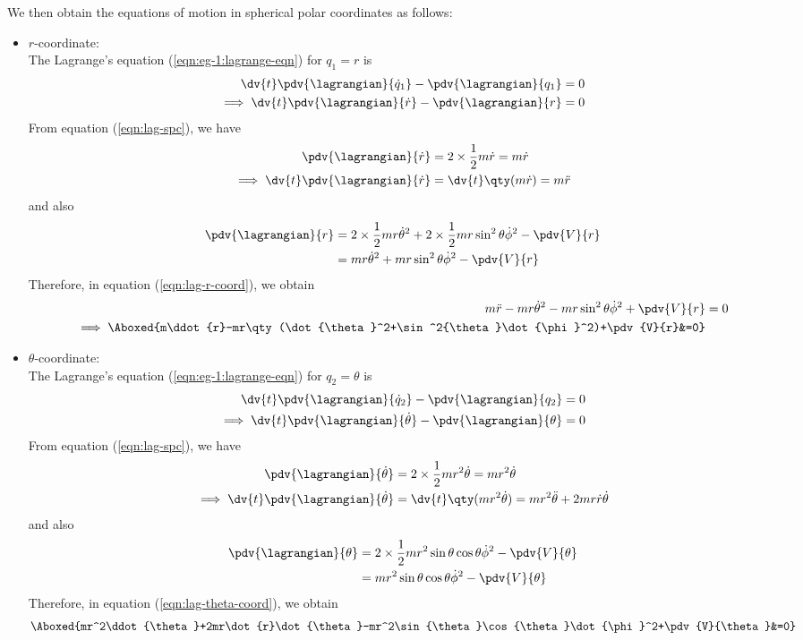 \begin{enumerate}
	We then obtain the equations of motion in spherical polar coordinates as follows:
	\begin{itemize}
		\item $r$-coordinate:\\
		The Lagrange's equation (\ref{eqn:eg-1:lagrange-eqn}) for $q_1=r$ is
		\begin{align}
			\dv{t}\pdv{\lagrangian}{\dot{q}_1}-\pdv{\lagrangian}{q_1}&=0 \nonumber\\
			\implies\dv{t}\pdv{\lagrangian}{\dot{r}}-\pdv{\lagrangian}{r}&=0 \label{eqn:lag-r-coord}
		\end{align}
		From equation (\ref{eqn:lag-spc}), we have
		\begin{align*}
			\pdv{\lagrangian}{\dot{r}}&=2\times\dfrac{1}{2}m\dot{r}=m\dot{r} \\
			\implies\dv{t}\pdv{\lagrangian}{\dot{r}}&=\dv{t}\qty(m\dot{r})=m\ddot{r}
		\end{align*}
		and also
		\begin{align*}
			\pdv{\lagrangian}{r}&=2\times\dfrac{1}{2}mr\dot{\theta}^2+2\times\dfrac{1}{2}mr\sin^2{\theta}\dot{\phi}^2-\pdv{V}{r} \\
			&=mr\dot{\theta}^2+mr\sin^2{\theta}\dot{\phi}^2-\pdv{V}{r}
		\end{align*}
		Therefore, in equation (\ref{eqn:lag-r-coord}), we obtain
		\begin{align*}
			m\ddot{r}-mr\dot{\theta}^2-mr\sin^2{\theta}\dot{\phi}^2+\pdv{V}{r}&=0 \\
			\implies\Aboxed{m\ddot{r}-mr\qty(\dot{\theta}^2+\sin^2{\theta}\dot{\phi}^2)+\pdv{V}{r}&=0}
		\end{align*}
		
		\item $\theta$-coordinate:\\
		The Lagrange's equation (\ref{eqn:eg-1:lagrange-eqn}) for $q_2=\theta$ is
		\begin{align}
			\dv{t}\pdv{\lagrangian}{\dot{q}_2}-\pdv{\lagrangian}{q_2}&=0 \nonumber\\
			\implies\dv{t}\pdv{\lagrangian}{\dot{\theta}}-\pdv{\lagrangian}{\theta}&=0 \label{eqn:lag-theta-coord}
		\end{align}
		From equation (\ref{eqn:lag-spc}), we have
		\begin{align*}
			\pdv{\lagrangian}{\dot{\theta}}&=2\times\dfrac{1}{2}mr^2\dot{\theta}=mr^2\dot{\theta} \\
			\implies\dv{t}\pdv{\lagrangian}{\dot{\theta}}&=\dv{t}\qty(mr^2\dot{\theta})=mr^2\ddot{\theta}+2mr\dot{r}\dot{\theta}
		\end{align*}
		and also
		\begin{align*}
			\pdv{\lagrangian}{\theta}&=2\times\dfrac{1}{2}mr^2\sin{\theta}\cos{\theta}\dot{\phi}^2-\pdv{V}{\theta} \\
			&=mr^2\sin{\theta}\cos{\theta}\dot{\phi}^2-\pdv{V}{\theta}
		\end{align*}
		Therefore, in equation (\ref{eqn:lag-theta-coord}), we obtain
		\begin{align*}
			\Aboxed{mr^2\ddot{\theta}+2mr\dot{r}\dot{\theta}-mr^2\sin{\theta}\cos{\theta}\dot{\phi}^2+\pdv{V}{\theta}&=0}
		\end{align*}
		

\end{itemize}
\end{enumerate}
